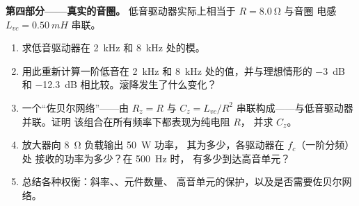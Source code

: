\begin{problem}
\medskip
\noindent\textbf{第四部分——真实的音圈。}
低音驱动器实际上相当于 $R = \qty{8.0}{\ohm}$ 与音圈
电感 $L_{vc} = \qty{0.50}{mH}$ 串联。
\begin{enumerate}[resume]
  \item 求低音驱动器在 \qty{2}{kHz} 和
        \qty{8}{kHz} 处的模。
  \item 用此重新计算一阶低音在 \qty{2}{kHz} 和
        \qty{8}{kHz} 处的值，并与理想情形的
        \qty{-3}{dB} 和 \qty{-12.3}{dB} 相比较。滚降发生了什么变化？
  \item 一个“佐贝尔网络”——由 $R_z = R$ 与 $C_z =
        L_{vc}/R^2$ 串联构成——与低音驱动器并联。证明
        该组合在所有频率下都表现为纯电阻 $R$，
        并求 $C_z$。
  \item 放大器向 \qty{8}{\ohm} 负载输出 \qty{50}{W} 功率，
        其为多少，各驱动器在 $f_c$（一阶分频）处
        接收的功率为多少？在 \qty{500}{Hz} 时，
        有多少到达高音单元？
  \item 总结各种权衡：斜率、、元件数量、
        高音单元的保护，以及是否需要佐贝尔网络。
\end{enumerate}
\end{problem}
